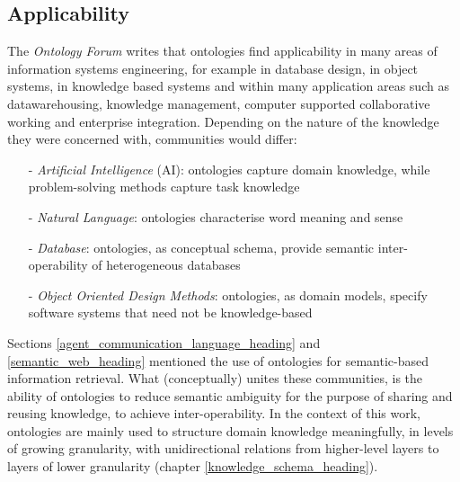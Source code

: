 %
%
%
%
%
%
%

\subsection{Applicability}
\label{applicability_heading}

The \emph{Ontology Forum} \cite{ontologyorg} writes that ontologies find
applicability in many areas of information systems engineering, for example in
database design, in object systems, in knowledge based systems and within many
application areas such as datawarehousing, knowledge management, computer
supported collaborative working and enterprise integration. Depending on the
nature of the knowledge they were concerned with, communities would differ:

\begin{itemize}
    \item[-] \emph{Artificial Intelligence} (AI): ontologies capture domain
        knowledge, while problem-solving methods capture task knowledge
    \item[-] \emph{Natural Language}: ontologies characterise word meaning and
        sense
    \item[-] \emph{Database}: ontologies, as conceptual schema, provide semantic
        inter-operability of heterogeneous databases
    \item[-] \emph{Object Oriented Design Methods}: ontologies, as domain models,
        specify software systems that need not be knowledge-based
\end{itemize}

Sections \ref{agent_communication_language_heading} and \ref{semantic_web_heading}
mentioned the use of ontologies for semantic-based information retrieval. What
(conceptually) unites these communities, is the ability of ontologies to reduce
semantic ambiguity for the purpose of sharing and reusing knowledge, to achieve
inter-operability. In the context of this work, ontologies are mainly used to
structure domain knowledge meaningfully, in levels of growing granularity, with
unidirectional relations from higher-level layers to layers of lower
granularity (chapter \ref{knowledge_schema_heading}).
